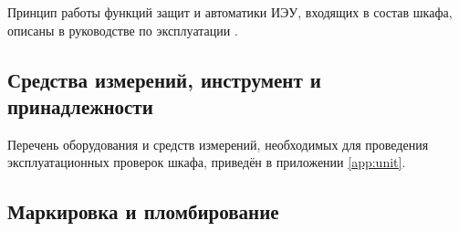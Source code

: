 \par
Принцип работы функций защит и автоматики ИЭУ, входящих в состав шкафа, описаны в руководстве по эксплуатации \ManualUnitDefinite.
\color{black}



\color{unidarkgreen}\subsection{Средства измерений, инструмент и принадлежности}\color{black}

\par
Перечень оборудования и средств измерений, необходимых для проведения эксплуатационных проверок шкафа, приведён в приложении \ref{app:unit}.



\color{unidarkgreen}\subsection{Маркировка и пломбирование}\color{black}

